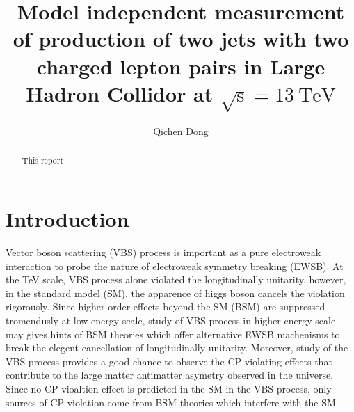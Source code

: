 \documentclass[12pt]{article}
\begin{document}
    \title{Model independent measurement of production of two jets with two charged lepton pairs in Large Hadron Collidor at ${\sqrt{\text{s}} = 13\ \text{TeV}}$}
    \author{Qichen Dong}
    \maketitle

    \begin{abstract}
        This report 
    \end{abstract}
    \newpage

    \section{Introduction}
        \par Vector boson scattering (VBS) process is important as a pure electroweak interaction to 
        probe the nature of electroweak symmetry breaking (EWSB). At the TeV scale, VBS process alone violated the longitudinally
        unitarity, however, in the standard model (SM), the apparence of higgs boson cancels the violation rigorously. Since higher order effects 
        beyond the SM (BSM) are suppressed tromendusly at low energy scale, study of VBS process in higher energy scale may gives hints of BSM theories 
        which offer alternative EWSB machenisms to break the elegent cancellation of longitudinally unitarity. Moreover, study of the VBS process provides
        a good chance to observe the CP violating effects that contribute to the large matter antimatter asymetry observed in the universe. Since no CP 
        vioaltion effect is predicted in the SM in the VBS process, only sources of CP violation come from BSM theories which interfere with the SM. 
\end{document}
